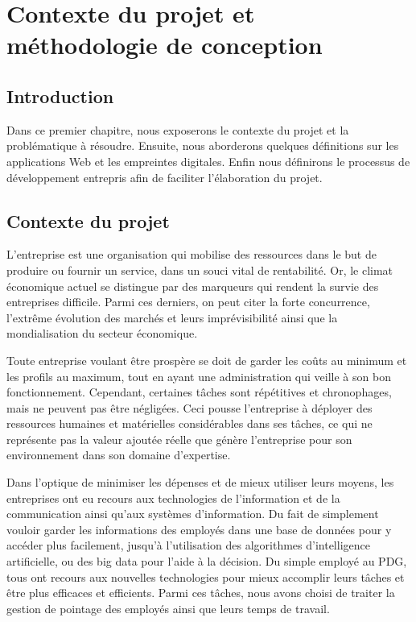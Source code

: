\chapter{Contexte du projet et méthodologie de
conception}
\renewcommand{\headrulewidth}{1pt}


\section{Introduction}
Dans ce premier chapitre, nous exposerons le contexte du projet et la
problématique à résoudre. Ensuite, nous aborderons quelques définitions sur les
applications Web et les empreintes digitales. Enfin nous définirons le processus de
développement entrepris afin de faciliter l’élaboration du projet.


\section{Contexte du projet}
L’entreprise est une organisation qui mobilise des ressources dans le but de
produire ou fournir un service, dans un souci vital de rentabilité. Or, le
climat économique actuel se distingue par des marqueurs qui rendent la survie
des entreprises difficile. Parmi ces derniers, on peut citer la forte
concurrence, l’extrême évolution des marchés et leurs imprévisibilité ainsi que
la mondialisation du secteur économique. 

Toute entreprise voulant être prospère se doit de garder les coûts au minimum et
les profils au maximum, tout en ayant une administration qui veille à son bon
fonctionnement. Cependant, certaines tâches sont répétitives et chronophages,
mais ne peuvent pas être négligées. Ceci pousse l’entreprise à déployer des
ressources humaines et matérielles considérables dans ses tâches, ce qui ne
représente pas la valeur ajoutée réelle que génère l’entreprise pour son
environnement dans son domaine d’expertise. 

Dans l’optique de minimiser les dépenses et de mieux utiliser leurs moyens, les
entreprises ont eu recours aux technologies de l’information et de la
communication ainsi qu’aux systèmes d’information. Du fait de simplement vouloir
garder les informations des employés dans une base de données pour y accéder
plus facilement, jusqu’à l’utilisation des algorithmes d’intelligence
artificielle, ou des big data pour l’aide à la décision. Du simple employé au
PDG, tous ont recours aux nouvelles technologies pour mieux accomplir leurs
tâches et être plus efficaces et efficients. Parmi ces tâches, nous avons choisi
de traiter la gestion de pointage des employés ainsi que leurs temps de travail.  

